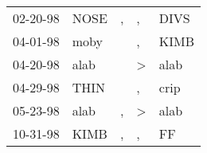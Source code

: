 \begin{supertabular}{p{0.07\textwidth}p{0.06\textwidth}p{0.02\textwidth}p{0.02\textwidth}p{0.06\textwidth}}
 02-20-98\textsuperscript{} &  NOSE\textsuperscript{} &  , &             , &  DIVS\textsuperscript{} \\
 04-01-98\textsuperscript{} &  moby\textsuperscript{} &    &             , &  KIMB\textsuperscript{} \\
 04-20-98\textsuperscript{} &  alab\textsuperscript{} &    &  \textgreater &  alab\textsuperscript{} \\
 04-29-98\textsuperscript{} &  THIN\textsuperscript{} &    &             , &  crip\textsuperscript{} \\
 05-23-98\textsuperscript{} &  alab\textsuperscript{} &  , &  \textgreater &  alab\textsuperscript{} \\
 10-31-98\textsuperscript{} &  KIMB\textsuperscript{} &  , &             , &    FF\textsuperscript{} \\
\end{supertabular}
